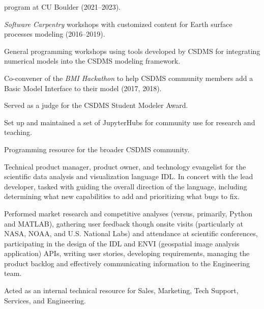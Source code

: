 \begin{compactitem}[\itembullet]
\begin{compactitem}[\itembullet]
        program at CU Boulder (2021--2023).
      \item
        \textit{Software Carpentry} workshops with customized content for Earth
        surface processes modeling (2016--2019).
      \item
        General programming workshops using tools developed by CSDMS for
        integrating numerical models into the CSDMS modeling framework.
    \end{compactitem}
    \item
    Co-convener of the \textit{BMI Hackathon} to help CSDMS
    community members add a Basic Model Interface to their model (2017, 2018).
  \item
    Served as a judge for the CSDMS Student Modeler Award.
  \item
    Set up and maintained a set of JupyterHubs for community use for research
    and teaching.
  \item
    Programming resource for the broader CSDMS community.
\end{compactitem}

\begin{compactitem}[\itembullet]
  \item Technical product manager, product owner, and technology
    evangelist for the scientific data analysis and visualization
    language IDL. In concert with the lead developer, tasked with
    guiding the overall direction of the language, including
    determining what new capabilities to add and prioritizing what
    bugs to fix.
  \item Performed market research and competitive analyses (versus,
    primarily, Python and MATLAB), gathering user feedback though
    onsite visits (particularly at NASA, NOAA, and U.S. National Labs)
    and attendance at scientific conferences, participating in the
    design of the IDL and ENVI (geospatial image analysis application)
    APIs, writing user stories, developing requirements, managing the
    product backlog and effectively communicating information to the
    Engineering team.
  \item Acted as an internal technical resource for Sales, Marketing,
    Tech Support, Services, and Engineering.
\end{compactitem}

